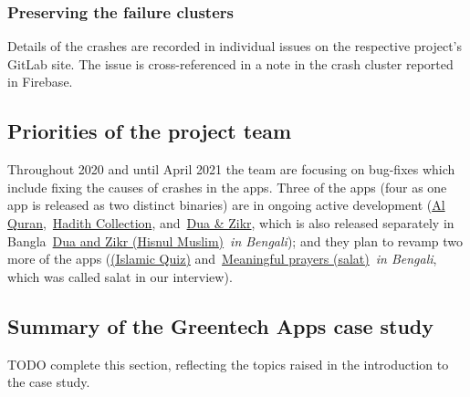 \subsubsection{Preserving the failure clusters}
Details of the crashes are recorded in individual issues on the respective project's GitLab site. The issue is cross-referenced in a note in the crash cluster reported in Firebase.

\subsection{Priorities of the project team}
Throughout 2020 and until April 2021 the team are focusing on bug-fixes which include fixing the causes of crashes in the apps. Three of the apps (four as one app is released as two distinct binaries) are in ongoing active development (\href{https://play.google.com/store/apps/details?id=com.greentech.quran}{Al Quran},~\href{https://play.google.com/store/apps/details?id=com.greentech.hadith}{Hadith Collection}, and~\href{https://play.google.com/store/apps/details?id=com.greentech.hisnulmuslim}{Dua \& Zikr}, which is also released separately in Bangla~\href{https://play.google.com/store/apps/details?id=com.greentech.hisnulmuslimbn}{{Dua and Zikr (Hisnul Muslim)}}~\emph{in Bengali}); and they plan to revamp two more of the apps (\href{https://play.google.com/store/apps/details?id=com.greentech.islamicquiz}{(Islamic Quiz)} and~\href{https://play.google.com/store/apps/details?id=com.greentech.salatbn}{Meaningful prayers (salat)}~\textit{in Bengali}, which was called salat in our interview).



\subsection{Summary of the Greentech Apps case study}
TODO complete this section, reflecting the topics raised in the introduction to the case study.